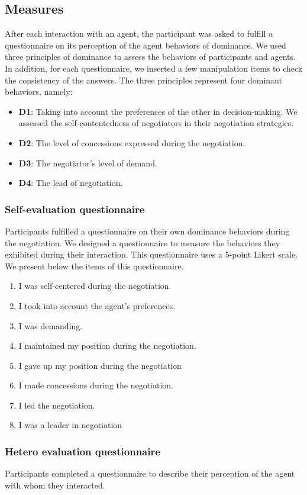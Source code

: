 \documentclass{llncs}
\begin{document}
\subsection{Measures}
After each interaction with an agent, the participant was asked to fulfill a questionnaire on its perception of the agent behaviors of dominance.
We used three principles of dominance to assess the behaviors of participants and agents. In addition, for each questionnaire, we inserted a few manipulation items to check the consistency of the answers.  The three principles represent four dominant behaviors, namely:
\begin{itemize}
	\item \textbf{D1}: Taking into account the preferences of the other in decision-making. We assessed the self-contentedness of negotiators in their negotiation strategies. 
	\item \textbf{D2}: The level of concessions expressed during the negotiation.
	\item \textbf{D3}: The negotiator's level of demand.
	\item \textbf{D4}: The lead of negotiation.
\end{itemize}

\subsubsection{Self-evaluation questionnaire}
Participants fulfilled a questionnaire on their own dominance behaviors during the negotiation. We designed a questionnaire to measure the behaviors they exhibited during their interaction. This questionnaire uses a 5-point Likert scale. We present below the items of this questionnaire. 
\begin{enumerate}
	\item I was self-centered during the negotiation.
	\item I took into account the agent's preferences.
	\item I was demanding.
	\item I maintained my position during the negotiation.
	\item I gave up my position during the negotiation
	\item I made concessions during the negotiation.	
	\item I led the negotiation.
	\item I was a leader in negotiation
\end{enumerate}

\subsubsection{Hetero evaluation questionnaire}
Participants completed a questionnaire to describe their perception of the agent with whom they interacted.
\end{document}

